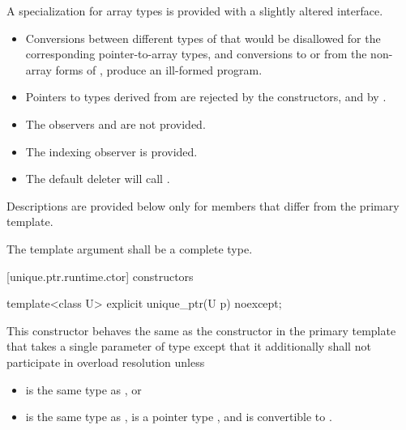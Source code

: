\pnum
A specialization for array types is provided with a slightly altered
interface.

\begin{itemize}
\item Conversions between different types of
that would be disallowed for the corresponding pointer-to-array types,
and conversions to or from the non-array forms of
, produce an ill-formed program.

\item Pointers to types derived from  are
rejected by the constructors, and by .

\item The observers  and
 are not provided.

\item The indexing observer  is provided.

\item The default deleter will call .
\end{itemize}

\pnum
Descriptions are provided below only for members that
differ from the primary template.

\pnum
The template argument  shall be a complete type.

[unique.ptr.runtime.ctor]{ constructors}

%
\begin{itemdecl}
template<class U> explicit unique_ptr(U p) noexcept;
\end{itemdecl}

\begin{itemdescr}
\pnum
This constructor behaves the same as
the constructor in the primary template that
takes a single parameter of type 
except that it additionally
shall not participate in overload resolution unless

\begin{itemize}
\item {} is the same type as , or
\item {} is the same type as ,
 is a pointer type , and
 is convertible to .
\end{itemize}
\end{itemdescr}


